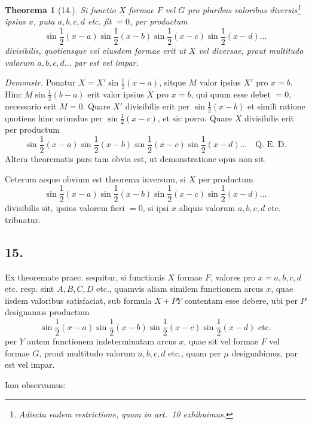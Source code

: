 \documentclass[12pt,a4paper]{article}
\theoremstyle{plain}
\newtheorem*{theorem}{Theorema}
\begin{document}
\begin{theorem}[14.] Si functio $X$ formae $F$ vel $G$ pro pluribus valoribus diversis\footnote{%
Adiecta eadem restrictione, quam in art.\ 10 exhibuimus.} ipsius $x$, puta $a, b, c, d$ etc. fit $=0$, per productum
\[
\sin\frac{1}{2}(x-a)\sin\frac{1}{2}(x-b)\sin\frac{1}{2}(x-c)\sin\frac{1}{2}(x-d)\ldots
\]
divisibilis, quotiensque vel eiusdem formae erit ut $X$ vel diversae, prout multitudo valorum $a, b, c, d\ldots$ par est vel impar.
\end{theorem}

\textit{Demonstr.} Ponatur $X = X'\sin\frac{1}{2}(x-a)$, sitque $M$ valor ipsius $X'$ pro $x=b$. Hinc $M\sin\frac{1}{2}(b-a)$ erit valor ipsius $X$ pro $x=b$, qui quum esse
debet $=0$, necessario erit $M=0$. Quare $X'$ divisibilis erit per $\sin\frac{1}{2}(x-b)$ et simili ratione quotiens hinc oriundus per $\sin\frac{1}{2}(x-c)$, et sic porro. Quare $X$
divisibilis erit per productum
\[
\sin\frac{1}{2}(x-a)\sin\frac{1}{2}(x-b)\sin\frac{1}{2}(x-c)\sin\frac{1}{2}(x-d)\ldots \quad\text{Q. E. D.}
\]
Altera theorematis pars tam obvia est, ut demonstratione opus non sit.

Ceterum aeque obvium est theorema inversum, si $X$ per productum
\[
\sin\frac{1}{2}(x-a)\sin\frac{1}{2}(x-b)\sin\frac{1}{2}(x-c)\sin\frac{1}{2}(x-d)\ldots
\]
divisibilis sit, ipsius valorem fieri $=0$, si ipsi $x$ aliquis valorum $a, b, c, d$ etc. tribuatur.

\subsection*{15.}

Ex theoremate praec. sequitur, si functionis $X$ formae $F$, valores pro
$x = a, b, c, d$ etc. resp. sint $A, B, C, D$ etc., quamvis aliam similem functionem arcus $x$, quae iisdem valoribus satisfaciat, sub formula $X + PY$ contentam esse
debere, ubi per $P$ designamus productum
\[
\sin\frac{1}{2}(x-a)\sin\frac{1}{2}(x-b)\sin\frac{1}{2}(x-c)\sin\frac{1}{2}(x-d)\text{ etc.}
\]
per $Y$ autem functionem indeterminatam arcus $x$, quae sit vel formae $F$ vel formae
$G$, prout multitudo valorum $a, b, c, d$ etc., quam per $\mu$ designabimus, par est vel impar.

Iam observamus:
\end{document}
